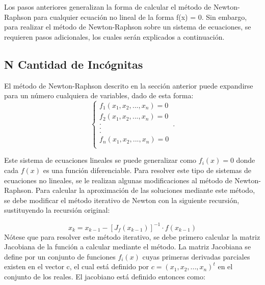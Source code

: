 \documentclass[journal]{IEEEtran}
\begin{document}
Los pasos anteriores generalizan la forma de calcular el método de Newton-Raphson para cualquier ecuación no lineal de la forma f(x) = 0. Sin embargo, para realizar el método de Newton-Raphson sobre un sistema de ecuaciones, se requieren pasos adicionales, los cuales serán explicados a continuación.

\subsection{N Cantidad de Incógnitas}
El método de Newton-Raphson descrito en la sección anterior puede expandirse para un número cualquiera de variables, dado de esta forma:
\begin{equation}
    \begin{cases}
      f_{1}(x_{1}, x_{2},..., x_{n}) = 0\\
      f_{2}(x_{1}, x_{2},..., x_{n}) = 0\\
        .\\
        .\\
        .\\
      f_{n}(x_{1}, x_{2},..., x_{n}) = 0\\
    \end{cases}\,.
    \label{eq: sisEqs}
\end{equation}

\indent Este sistema de ecuaciones lineales se puede generalizar como \(f_{i}(x) = 0\) donde cada \(f(x)\) es una función diferenciable. Para resolver este tipo de sistemas de ecuaciones no lineales, se le realizan algunas modificaciones al método de Newton-Raphson. Para calcular la aproximación de las soluciones mediante este método, se debe modificar el método iterativo de Newton con la siguiente recursión, sustituyendo la recursión original:

\begin{equation}
x_{k} = x_{k - 1} - [J_{f}(x_{k - 1})]^{-1} \cdot f(x_{k - 1})
\label{eq:NRvarvar}
\end{equation}
\indent Nótese que para resolver este método iterativo, se debe primero calcular la matriz Jacobiana de la función a calcular mediante el método. La matriz Jacobiana se define por un conjunto de funciones \(f_{i}(x)\) cuyas primeras derivadas parciales existen en el vector c, el cual está definido por \(c = (x_{1}, x_{2}, ..., x_{n})^t\) en el conjunto de los reales. El jacobiano está definido entonces como:
\end{document}
